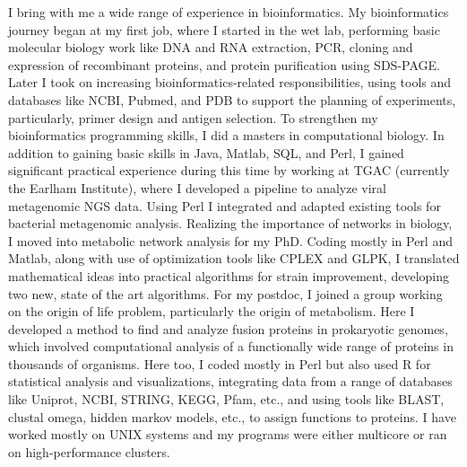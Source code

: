 \documentclass[11pt,a4paper,sans]{moderncv}        %
\begin{document}
I bring with me a wide range of experience in bioinformatics. My bioinformatics journey began at my first job, where I started in the wet lab, performing basic molecular biology work like DNA and RNA extraction, PCR, cloning and expression of recombinant proteins, and protein purification using SDS-PAGE. Later I took on increasing bioinformatics-related responsibilities, using tools and databases like NCBI, Pubmed, and PDB to support the planning of experiments, particularly, primer design and antigen selection. To strengthen my bioinformatics programming skills, I did a masters in computational biology. In addition to gaining basic skills in Java, Matlab, SQL, and Perl, I gained significant practical experience during this time by working at TGAC (currently the Earlham Institute), where I developed a pipeline to analyze viral metagenomic NGS data. Using Perl I integrated and adapted existing tools for bacterial metagenomic analysis. Realizing the importance of networks in biology, I moved into metabolic network analysis for my PhD. Coding mostly in Perl and Matlab, along with use of optimization tools like CPLEX and GLPK, I translated mathematical ideas into practical algorithms for strain improvement, developing two new, state of the art algorithms. For my postdoc, I joined a group working on the origin of life problem, particularly the origin of metabolism. Here I developed a method to find and analyze fusion proteins in prokaryotic genomes, which involved computational analysis of a functionally wide range of proteins in thousands of organisms. Here too, I coded mostly in Perl but also used R for statistical analysis and visualizations, integrating data from a range of databases like Uniprot, NCBI, STRING, KEGG, Pfam, etc., and using tools like BLAST, clustal omega, hidden markov models, etc., to assign functions to proteins. I have worked mostly on UNIX systems and my programs were either multicore or ran on high-performance clusters.
\end{document}

